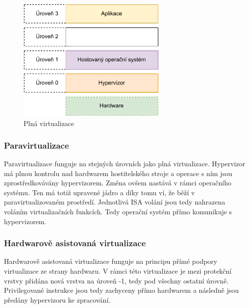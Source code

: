 \begin{figure}[htbp]
    \centering 
    \includegraphics[width=0.65\textwidth]{assets/img/full_virt.pdf}
    \caption{Plná virtualizace}
    \label{fig:full_virt}
\end{figure}


\subsubsection{Paravirtualizace}

Paravirtualizace funguje na stejných úrovních jako plná virtualizace. Hypervizor má plnou kontrolu nad hardwarem hostitelského stroje a operace s ním jsou zprostředkovávány hypervizorem. Změna ovšem nastává v rámci operačního systému. Ten má totiž upravené jádro a díky tomu ví, že běží v paravirtualizovaném prostředí. Jednotlivá ISA volání jsou tedy nahrazena voláním virtualizačních funkcích. Tedy operační systém přímo komunikuje s hypervizorem.\cite{4709159}


\subsubsection{Hardwarově asistovaná virtualizace}

Hardwarově asistovaná virtualizace funguje na principu přímé podpory virtualizace ze strany hardwaru. V rámci této virtualizace je mezi protekční vrstvy přidána nová vrstva na úroveň -1, tedy pod všechny ostatní úrovně. Privilegované instrukce jsou tedy zachyceny přímo hardwarem a následně jsou předány hypervizoru ke zpracování.\cite{4709159}

